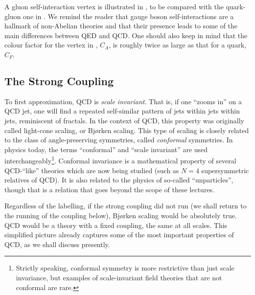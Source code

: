 A gluon self-interaction vertex is
illustrated in , to be compared with the quark-gluon
one in . We remind the reader that gauge boson
self-interactions are a hallmark of non-Abelian theories and that their
presence leads to some of the main differences between QED and
QCD. One should also keep in mind 
that the colour factor for the vertex in , $C_A$, 
is roughly twice as large as that for a quark, $C_F$.

\subsection{The Strong Coupling \label{sec:coupling}}
To first approximation, QCD is 
\emph{scale invariant}. That is, if one
``zooms in'' on a QCD jet, one will find a repeated self-similar 
pattern of jets within jets within jets, reminiscent of
fractals. 
In the context of QCD, this property was originally 
called light-cone scaling, or 
Bj{\o}rken scaling. 
This type of scaling is closely related to the class of
angle-preserving symmetries, called \emph{conformal} symmetries. In physics 
today, the terms ``conformal'' and ``scale invariant'' are used 
interchangeably\footnote{Strictly speaking, conformal symmetry is more
restrictive than just scale invariance, but examples of
scale-invariant field theories that are not conformal are rare.}.
Conformal invariance is a mathematical property of several
QCD-``like'' theories which are now being studied (such as $N=4$
supersymmetric relatives of QCD). It is also 
related to the physics of so-called ``unparticles'', though that is a
relation that goes beyond the scope of these lectures.

Regardless of the labelling, 
if the  strong coupling did not run (we shall
return to the running 
of the coupling below), Bj{\o}rken scaling would be absolutely true. QCD
would be a theory with a fixed coupling, the same at all scales. 
This simplified picture already captures some of the most important
properties of QCD, as we shall discuss presently.  

